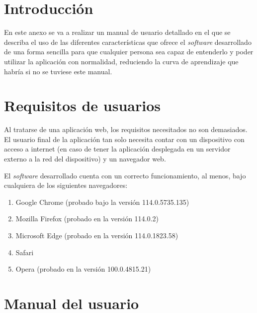 
\section{Introducción}
En este anexo se va a realizar un manual de usuario detallado en el que se describa el uso de las diferentes características que ofrece el \textit{software} desarrollado de una forma sencilla para que cualquier persona sea capaz de entenderlo y poder utilizar la aplicación con normalidad, reduciendo la curva de aprendizaje que habría si no se tuviese este manual.

\section{Requisitos de usuarios}
Al tratarse de una aplicación web, los requisitos necesitados no son demasiados.
El usuario final de la aplicación tan solo necesita contar con un dispositivo con acceso a internet (en caso de tener la aplicación desplegada en un servidor externo a la red del dispositivo) y un navegador web.

El \textit{software} desarrollado cuenta con un correcto funcionamiento, al menos, bajo cualquiera de los siguientes navegadores:

\begin{enumerate}
\item Google Chrome (probado bajo la versión 114.0.5735.135)
\item Mozilla Firefox (probado en la versión 114.0.2)
\item Microsoft Edge (probado en la versión 114.0.1823.58)
\item Safari
\item Opera (probado en la versión 100.0.4815.21)
\end{enumerate}

\section{Manual del usuario}



